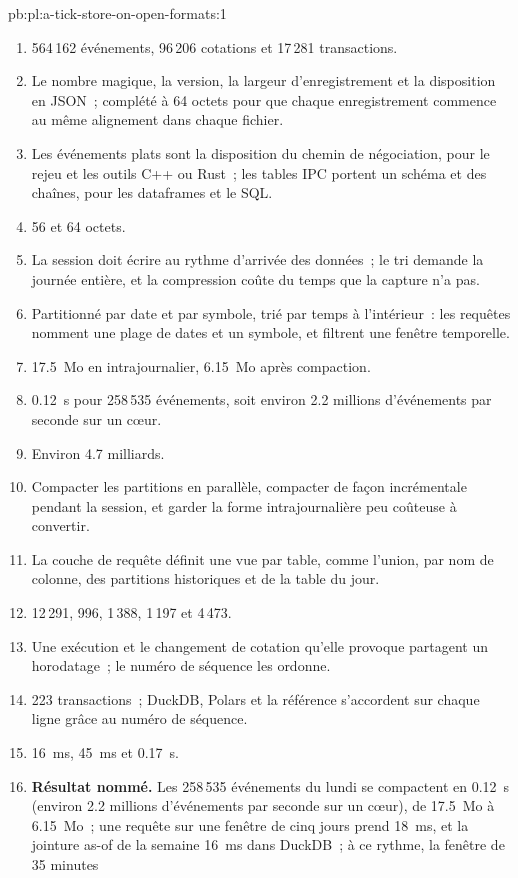 \begin{solution}{pb:pl:a-tick-store-on-open-formats:1}
\begin{enumerate}
\item 564\,162 événements, 96\,206 cotations et 17\,281 transactions.
\item Le nombre magique, la version, la largeur d'enregistrement et la disposition en JSON~; complété à 64 octets pour que chaque enregistrement commence
au même alignement dans chaque fichier.
\item Les événements plats sont la disposition du chemin de négociation, pour le rejeu et les outils C++ ou Rust~; les tables IPC portent un schéma et
des chaînes, pour les dataframes et le SQL.
\item 56 et 64 octets.
\item La session doit écrire au rythme d'arrivée des données~; le tri demande la journée entière, et la compression coûte du temps
que la capture n'a pas.
\item Partitionné par date et par symbole, trié par temps à l'intérieur~: les requêtes nomment une plage de dates et un symbole, et filtrent une fenêtre temporelle.
\item 17.5~Mo en intrajournalier, 6.15~Mo après compaction.
\item 0.12~s pour 258\,535 événements, soit environ 2.2 millions d'événements par seconde sur un cœur.
\item Environ 4.7 milliards.
\item Compacter les partitions en parallèle, compacter de façon incrémentale pendant la session, et garder la forme intrajournalière peu coûteuse à convertir.
\item La couche de requête définit une vue par table, comme l'union, par nom de colonne, des partitions historiques et de la table du
jour.
\item 12\,291, 996, 1\,388, 1\,197 et 4\,473.
\item Une exécution et le changement de cotation qu'elle provoque partagent un horodatage~; le numéro de séquence les ordonne.
\item 223 transactions~; DuckDB, Polars et la référence s'accordent sur chaque ligne grâce au numéro de séquence.
\item 16~ms, 45~ms et 0.17~s.
\item \textbf{Résultat nommé.} Les 258\,535 événements du lundi se compactent en 0.12~s (environ 2.2 millions d'événements par seconde sur un cœur), de
17.5~Mo à 6.15~Mo~; une requête sur une fenêtre de cinq jours prend 18~ms, et la jointure as-of de la semaine 16~ms dans DuckDB~; à ce rythme, la fenêtre de 35 minutes

\end{enumerate}
\end{solution}
